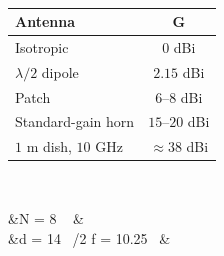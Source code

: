 \documentclass[10pt]{extarticle} %
\newcommand{\grp}[1]{\vspace{1pt}{\sffamily\bfseries\footnotesize #1}\ {\color{black!45}\hrulefill}\vspace{-4pt}}
\newcommand{\eqL}[1]{\begin{flalign*}#1\end{flalign*}}
\begin{document}
\begin{multicols*}{3}
\grp{Typical gains (sanity check)}
\vspace{2pt}
\begin{center}
\renewcommand{\arraystretch}{1.25}
\setlength{\tabcolsep}{6pt}
\begin{tabular}{| l | c |}
\hline
\textbf{Antenna} & $\boldsymbol{G}$ \\ \hline
Isotropic            & $0$ dBi \\ \hline
$\lambda/2$ dipole   & $2.15$ dBi \\ \hline
Patch                & $6$--$8$ dBi \\ \hline
Standard-gain horn   & $15$--$20$ dBi \\ \hline
$1$ m dish, $10$ GHz & $\approx 38$ dBi \\ \hline
\end{tabular}
\end{center}

\grp{Course array (ADALM-PHASER)}
\def\linespacing{7pt}
\eqL{
&N = 8 \  &\\[\linespacing]
&d = 14\ \text{mm} \approx \lambda/2 \qquad f = 10.25\ \text{GHz} &
}

\end{multicols*}
\end{document}
